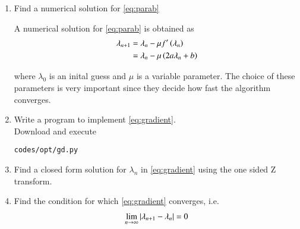 \renewcommand{\theequation}{\theenumi}
\begin{enumerate}[label=\thesubsection.\arabic*.,ref=\thesubsection.\theenumi]
%
%

\item
Find a numerical solution for \eqref{eq:parab}

%
%
\solution
A numerical solution for \eqref{eq:parab} is obtained as
%
\begin{align}
\lambda_{n+1}&=\lambda_{n}-\mu f^{\prime}\left(\lambda_n\right)
\\
&=\lambda_{n} -\mu \left(2a\lambda_n+b\right)
\label{eq:gradient}
\end{align}

%
where $\lambda_0$ is an inital guess and $\mu$ is a variable parameter. The choice of these parameters is very important since they decide how fast the algorithm converges.
%
\item
Write a program to implement \eqref{eq:gradient}.
%
\\
\solution Download and execute
\begin{lstlisting}
codes/opt/gd.py
\end{lstlisting}
%
\item Find a closed form solution for $\lambda_n$ in  \eqref{eq:gradient} using the one sided Z transform.
%
\item Find the condition for which \eqref{eq:gradient} converges, i.e.
\begin{align}
\lim_{n \to \infty}\left\vert\lambda_{n+1}-\lambda_n\right\vert = 0
\end{align}
\end{enumerate}


